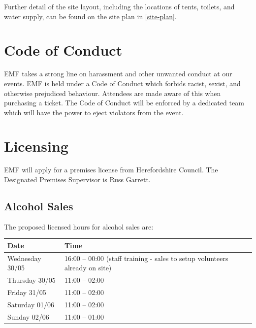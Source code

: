 Further detail of the site layout, including the locations of tents, toilets,
and water supply, can be found on the site plan in \cref{site-plan}.

\section{Code of Conduct}

EMF takes a strong line on harassment and other unwanted conduct at our events. EMF
is held under a Code of Conduct which forbids racist, sexist, and otherwise prejudiced
behaviour. Attendees are made aware of this when purchasing a ticket. The Code of Conduct
will be enforced by a dedicated team which will have the power to eject violators
from the event.

\newpage

\section{Licensing}

EMF will apply for a premises license from Herefordshire Council.
The Designated Premises Supervisor is Russ Garrett.

\subsection{Alcohol Sales}

The proposed licensed hours for alcohol sales are:

\begin{table}[h!]
    \centering
    \begin{tabular}{| l l |}
        \hline
        \textbf{Date}   & \textbf{Time}                                                               \\
        \hline
        Wednesday 30/05 & 16:00 -- 00:00 (staff training - sales to setup volunteers already on site) \\
        Thursday 30/05  & 11:00 -- 02:00                                                              \\
        Friday 31/05    & 11:00 -- 02:00                                                              \\
        Saturday 01/06  & 11:00 -- 02:00                                                              \\
        Sunday 02/06    & 11:00 -- 01:00                                                              \\
        \hline
    \end{tabular}
    \centering
\end{table}

